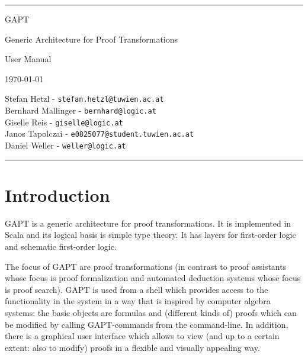 \documentclass[a4paper,11pt]{article}
\begin{document}
\begin{titlepage}
\begin{center}

\hrule

\vspace*{20mm}

{\Huge GAPT}

\vspace*{5mm}

{\huge Generic Architecture for Proof Transformations}

\vspace*{20mm}

{\Huge User Manual}

\vspace*{50mm}

{\Large \today}

\vspace*{20mm}

{\Large
Stefan Hetzl - \texttt{stefan.hetzl@tuwien.ac.at}\\
Bernhard Mallinger - \texttt{bernhard@logic.at}\\
Giselle Reis - \texttt{giselle@logic.at}\\
Janos Tapolczai - \texttt{e0825077@student.tuwien.ac.at}\\
Daniel Weller - \texttt{weller@logic.at}
}

\vspace*{20mm}

\hrule
\end{center}



\end{titlepage}

\tableofcontents
\vfill
\pagebreak

\section{Introduction}

GAPT is a generic architecture for proof transformations. It is implemented
in Scala and its logical basis is simple type theory. It has
layers for first-order logic and schematic first-order logic.

The focus of GAPT are proof transformations (in contrast to proof assistants
whose focus is proof formalization and automated deduction systems whose focus
is proof search). GAPT is used from a shell which provides access to the functionality
in the system in a way that is inspired by computer algebra systems: the basic
objects are formulas and (different kinds of) proofs which can be modified
by calling GAPT-commands from the command-line. In addition, there
is a graphical user interface which allows to view (and up to a certain extent:
also to modify) proofs in a flexible and visually appealing way.
\end{document}
